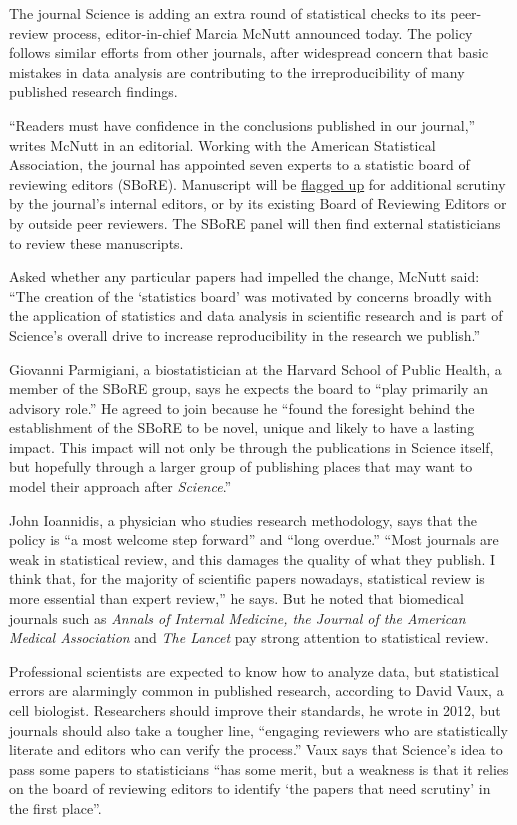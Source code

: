 The journal Science is adding an extra round of statistical checks to
its peer-review process, editor-in-chief Marcia McNutt announced today.
The policy follows similar efforts from other journals, after widespread
concern that basic mistakes in data analysis are contributing to the
irreproducibility of many published research findings.

``Readers must have confidence in the conclusions published in our
journal,'' writes McNutt in an editorial. Working with the American
Statistical Association, the journal has appointed seven experts to a
statistic board of reviewing editors (SBoRE). Manuscript will be
\uline{flagged up} for additional scrutiny by the journal's internal
editors, or by its existing Board of Reviewing Editors or by outside
peer reviewers. The SBoRE panel will then find external statisticians to
review these manuscripts.

Asked whether any particular papers had impelled the change, McNutt
said: ``The creation of the `statistics board' was motivated by concerns
broadly with the application of statistics and data analysis in
scientific research and is part of Science's overall drive to increase
reproducibility in the research we publish.''

Giovanni Parmigiani, a biostatistician at the Harvard School of Public
Health, a member of the SBoRE group, says he expects the board to ``play
primarily an advisory role.'' He agreed to join because he ``found the
foresight behind the establishment of the SBoRE to be novel, unique and
likely to have a lasting impact. This impact will not only be through
the publications in Science itself, but hopefully through a larger group
of publishing places that may want to model their approach
after \emph{Science}.''

John Ioannidis, a physician who studies research methodology, says that
the policy is ``a most welcome step forward'' and ``long overdue.''
``Most journals are weak in statistical review, and this damages the
quality of what they publish. I think that, for the majority of
scientific papers nowadays, statistical review is more essential than
expert review,'' he says. But he noted that biomedical journals such as
\emph{Annals of Internal Medicine, the Journal of the American Medical
Association} and \emph{The Lancet} pay strong attention to statistical review.

Professional scientists are expected to know how to analyze data, but
statistical errors are alarmingly common in published research,
according to David Vaux, a cell biologist. Researchers should improve
their standards, he wrote in 2012, but journals should also take a
tougher line, ``engaging reviewers who are statistically literate and
editors who can verify the process.'' Vaux says that Science's idea to
pass some papers to statisticians ``has some merit, but a weakness is
that it relies on the board of reviewing editors to identify `the papers
that need scrutiny' in the first place''.


